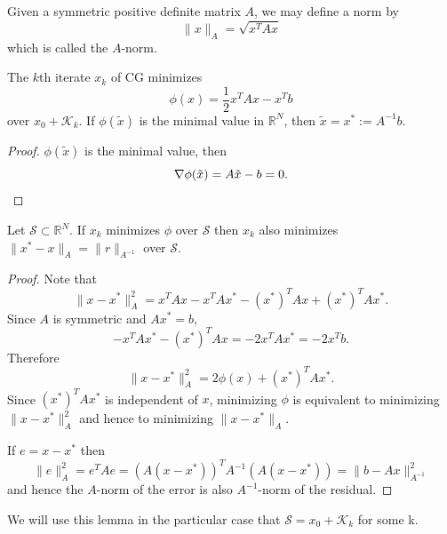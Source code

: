 \begin{defi}
  Given a symmetric positive definite matrix $A$, we may define a norm
  by
  \begin{equation}
    \label{eq:2.1}
    \|x\|_{A}=\sqrt{x^TAx}
  \end{equation}
  which is called the $A$-norm.
\end{defi}



\begin{lemma}
  The $k$th iterate $x_k$ of CG minimizes
  \begin{equation}
    \label{eq:2.2}
    \phi(x)=\frac{1}{2}x^TAx - x^Tb
  \end{equation}
  over $x_0+\mathcal{K}_k$. If $\phi(\tilde{x})$ is the minimal value
  in $\mathbb{R}^N$, then $\tilde{x}=x^*:=A^{-1}b$.
\end{lemma} 

\begin{proof}
  $\phi(\tilde{x})$ is the minimal value, then
  \begin{equation*}
    \nabla\phi(\tilde{x})=A\tilde{x}-b = 0.\qedhere
  \end{equation*}
\end{proof}

\begin{lemma}
  Let $\mathcal{S}\subset \mathbb{R}^N$. If $x_k$ minimizes $\phi$
  over $\mathcal{S}$ then $x_k$ also minimizes
  $\|x^*-x\|_A=\|r\|_{A^{-1}}$ over $\mathcal{S}$.
\end{lemma}

\begin{proof}
  Note that
  $$\|x-x^*\|^2_A = x^TAx - x^TAx^*
  -(x^*)^TAx+(x^*)^TAx^*.$$
  Since $A$ is symmetric and $Ax^*=b$,
  $$-x^TAx^*-(x^*)^TAx = -2x^TAx^*=-2x^Tb.$$
  Therefore $$\|x-x^*\|_A^2=2\phi(x)+(x^*)^TAx^*.$$
  Since $(x^*)^TAx^*$ is independent of $x$, minimizing $\phi$ is
  equivalent to minimizing $\|x-x^*\|_A^2$ and hence to minimizing
  $\|x-x^*\|_A.$

  If $e=x-x^*$ then
  $$\|e\|^2_A=e^TAe=(A(x-x^*))^TA^{-1}(A(x-x^*))=\|b-Ax\|_{A^{-1}}^2$$
  and hence the $A$-norm of the error is also $A^{-1}$-norm of the residual.
\end{proof}

\begin{rmk}
  We will use this lemma in the particular case that
  $\mathcal{S}=x_0+\mathcal{K}_k$ for some k.
\end{rmk}

